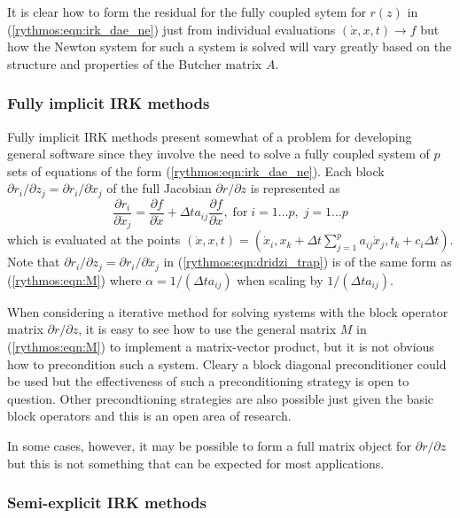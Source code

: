 \documentclass[pdf,ps2pdf,11pt]{SANDreport}
\begin{document}
It is clear how to form the residual for the fully coupled sytem for $r(z)$ in
(\ref{rythmos:eqn:irk_dae_ne}) just from individual evaluations $(\dot{x},x,t)
{}\rightarrow f$ but how the Newton system for such a system is solved will
vary greatly based on the structure and properties of the Butcher matrix $A$.

\subsubsection*{Fully implicit IRK methods}

Fully implicit IRK methods present somewhat of a problem for developing
general software since they involve the need to solve a fully coupled system
of $p$ sets of equations of the form (\ref{rythmos:eqn:irk_dae_ne}).  Each
block ${}\partial r_i / {}\partial z_j = {}\partial r_i / {}\partial
{}\dot{x}_j$ of the full Jacobian ${}\partial r / {}\partial z$ is represented
as
%
\begin{equation}
\frac{\partial r_i}{\partial \dot{x}_j}
= \frac{\partial f}{\partial \dot{x}}
+ \Delta t a_{ij} \frac{\partial f}{\partial x},
\; \mbox{for} \; i = 1 \ldots p, \; j = 1 \ldots p
\label{rythmos:eqn:dridzi_trap}
\end{equation}
%
which is evaluated at the points $(\dot{x},x,t) = ( {}\dot{x}_i, x_k +
{}\Delta t {}\sum_{j=1}^{p} a_{ij} {}\dot{x}_j, t_k + c_i {}\Delta t )$.  Note
that ${}\partial r_i / {}\partial z_j = {}\partial r_i / {}\partial
{}\dot{x}_j$ in (\ref{rythmos:eqn:dridzi_trap}) is of the same form as
(\ref{rythmos:eqn:M}) where $\alpha = 1 / (\Delta t a_{ij})$ when scaling by
$1 / (\Delta t a_{ij})$.

When considering a iterative method for solving systems with the block
operator matrix ${}\partial r / {}\partial z$, it is easy to see how to use
the general matrix $M$ in (\ref{rythmos:eqn:M}) to implement a matrix-vector
product, but it is not obvious how to precondition such a system.  Cleary a
block diagonal preconditioner could be used but the effectiveness of such a
preconditioning strategy is open to question.  Other precondtioning strategies
are also possible just given the basic block operators and this is an open
area of research.

In some cases, however, it may be possible to form a full matrix object for
${}\partial r / {}\partial z$ but this is not something that can be expected
for most applications.

\subsubsection*{Semi-explicit IRK methods}
\end{document}
